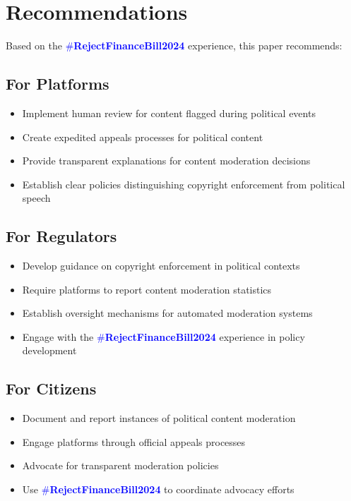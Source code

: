 \documentclass{article}
\newcommand{\rejectbill}{\textcolor{blue}{\#\textbf{RejectFinanceBill2024}}}
\begin{document}
\section{Recommendations}

Based on the \rejectbill{} experience, this paper recommends:

\subsection{For Platforms}

\begin{itemize}
\item Implement human review for content flagged during political events
\item Create expedited appeals processes for political content
\item Provide transparent explanations for content moderation decisions
\item Establish clear policies distinguishing copyright enforcement from political speech
\end{itemize}

\subsection{For Regulators}

\begin{itemize}
\item Develop guidance on copyright enforcement in political contexts
\item Require platforms to report content moderation statistics
\item Establish oversight mechanisms for automated moderation systems
\item Engage with the \rejectbill{} experience in policy development
\end{itemize}

\subsection{For Citizens}

\begin{itemize}
\item Document and report instances of political content moderation
\item Engage platforms through official appeals processes
\item Advocate for transparent moderation policies
\item Use \rejectbill{} to coordinate advocacy efforts
\end{itemize}
\end{document}
